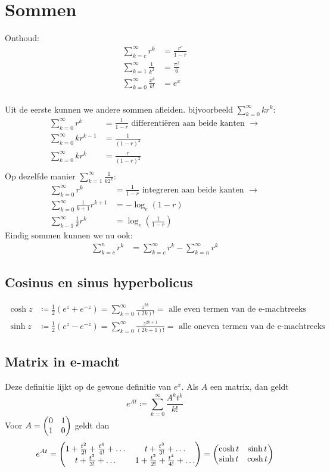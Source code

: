 \documentclass{article}
\begin{document}
	\tableofcontents
	\section{Sommen}
 		Onthoud:
 		\begin{align*}
 			\sum_{k=c}^{\infty} r^k &= \frac{r^c}{1-r} \\
 			\sum_{k=1}^{\infty} \frac{1}{k^2} &= \frac{\pi^2}{6} \\
 			\sum_{k=0}^\infty \frac{x^k}{k!} &= e^x \\
 		\end{align*}
 		
 		Uit de eerste kunnen we andere sommen afleiden. bijvoorbeeld 
 		$\displaystyle \sum_{k=0}^{\infty} kr^k: $
 		\begin{align*}
 				\sum_{k=0}^{\infty} r^k &= \frac{1}{1-r} \text { differenti\"eren aan beide kanten } \to \\
 				\sum_{k=0}^{\infty} kr^{k-1} &= \frac{1}{(1-r)^2} \\
 				\sum_{k=0}^{\infty} kr^k &= \frac{r}{(1-r)^2} \\
 		\end{align*}
 		Op dezelfde manier $\displaystyle \sum_{k=1}^{\infty} \frac{1}{k2^k}$:
 		\begin{align*}
 				\sum_{k=0}^{\infty} r^k &= \frac{1}{1-r} \text { integreren aan beide kanten } \to \\
 				\sum_{k=0}^{\infty} \frac{1}{k+1} r^{k+1} &= -\log_e (1-r) \\
 				\sum_{k-1}^\infty \frac{1}{k} r^k &= \log_e (\frac{1}{1-r})
 		\end{align*}
 		Eindig sommen kunnen we nu ook:
 		\begin{align*}
 			\sum_{k=c}^n r^k &= \sum_{k=c}^\infty r^k - \sum_{k=n}^\infty r^k
 		\end{align*}

	\subsection{Cosinus en sinus hyperbolicus}
		\begin{align*}
			\cosh z &\coloneqq \frac{1}{2} (e^z + e^{-z}) = \sum_{k=0}^\infty \frac{z^{2k}}{(2k)!} = \text{ alle even termen van de e-machtreeks} \\
			\sinh z &\coloneqq \frac{1}{2} (e^z - e^{-z}) = \sum_{k=0}^\infty \frac{z^{2k+1}}{(2k+1)!} = \text{ alle oneven termen van de e-machtreeks}
		\end{align*}
	\subsection{Matrix in e-macht}
		Deze definitie lijkt op de gewone definitie van $e^x$. Als $A$ een matrix, dan geldt
		\[ e^{At} \coloneqq \sum_{k=0}^\infty \frac{A^k t^k}{k!} \]
		Voor $\displaystyle A = \begin{pmatrix} 0 & 1 \\ 1 & 0 \end{pmatrix}$ geldt dan
		\[ e^{At} =
		\begin{pmatrix} 1 + \frac{t^2}{2!} + \frac{t^4}{4!} + \dots & t + \frac{t^3}{3!} + \dots \\
			t + \frac{t^3}{3!} + \dots & 1 + \frac{t^2}{2!} + \frac{t^4}{4!} + \dots \end{pmatrix}
		= \begin{pmatrix} \cosh t & \sinh t \\ \sinh t & \cosh t \end{pmatrix}\]
 		
\end{document}
